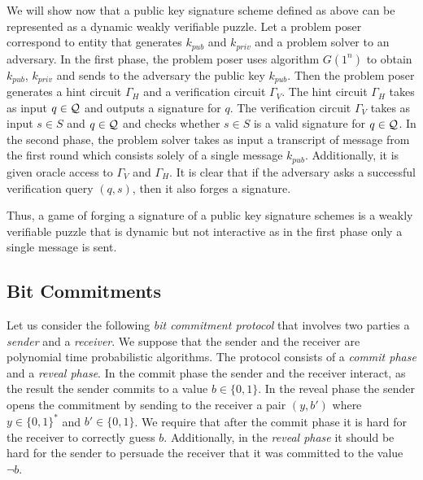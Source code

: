 %
We will show now that a public key signature scheme defined as above can be represented as a dynamic weakly verifiable puzzle.
Let a problem poser correspond to entity that generates $k_{pub}$ and $k_{priv}$ and a problem solver to an adversary.
In the first phase, the problem poser uses algorithm $G(1^n)$ to obtain $k_{pub}$, $k_{priv}$ and sends to the adversary the public key $k_{pub}$.
Then the problem poser generates a hint circuit $\Gamma_H$ and a verification circuit $\Gamma_V$.
The hint circuit $\Gamma_H$ takes as input $q \in \mathcal{Q}$ and outputs a signature for $q$. The verification circuit
$\Gamma_V$ takes as input $s \in S$ and $q \in \mathcal{Q}$ and checks whether $s \in S$ is a valid signature for $q \in \mathcal{Q}$.
In the second phase, the problem solver takes as input a transcript of message from the first round which consists solely of a single message $k_{pub}$.
Additionally, it is given oracle access to $\Gamma_V$ and $\Gamma_H$.
It is clear that if the adversary asks a successful verification query $(q,s)$,
then it also forges a signature.

Thus, a game of forging a signature of a public key signature schemes is a weakly verifiable puzzle that
is dynamic but not interactive as in the first phase only a single message is sent.
%
\subsection{Bit Commitments}
Let us consider the following \textit{bit commitment protocol} that involves two parties a \textit{sender} and a \textit{receiver}.
We suppose that the sender and the receiver are polynomial time probabilistic algorithms.
The protocol consists of a \textit{commit phase} and a \textit{reveal phase}.
In the commit phase the sender and the receiver interact, as the result the sender commits to a value $b \in \{0,1\}$.
In the reveal phase the sender opens the commitment by sending to the receiver a pair $(y,b')$ where $y \in \{0,1\}^{*}$ and $b' \in \{0,1\}$.
We require that after the commit phase it is hard for the receiver to correctly guess $b$. Additionally, in the \textit{reveal phase}
it should be hard for the sender to persuade the receiver that it was committed to the value $\lnot b$.

